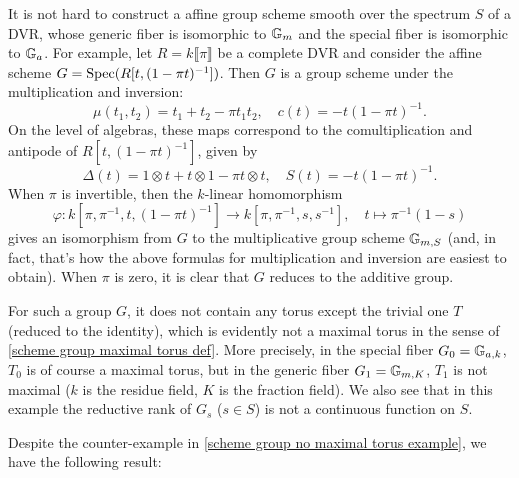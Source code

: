 \begin{remark}\label{scheme group no maximal torus example}
It is not hard to construct a affine group scheme smooth over the spectrum $S$ of a DVR, whose generic fiber is isomorphic to $\mathbb{G}_m$ and the special fiber is isomorphic to $\mathbb{G}_a$. For example, let $R=k\llbracket\pi\rrbracket$ be a complete DVR and consider the affine scheme $G=\mathrm{Spec}(R[t,(1-\pi t)^{-1}])$. Then $G$ is a group scheme under the multiplication and inversion:
\[\mu(t_1,t_2)=t_1+t_2-\pi t_1t_2,\quad c(t)=-t(1-\pi t)^{-1}.\]
On the level of algebras, these maps correspond to the comultiplication and antipode of $R[t,(1-\pi t)^{-1}]$, given by
\[\Delta(t)=1\otimes t+t\otimes 1-\pi t\otimes t,\quad S(t)=-t(1-\pi t)^{-1}.\]
When $\pi$ is invertible, then the $k$-linear homomorphism
\[\varphi:k[\pi,\pi^{-1},t,(1-\pi t)^{-1}]\to k[\pi,\pi^{-1},s,s^{-1}],\quad t\mapsto\pi^{-1}(1-s)\]
gives an isomorphism from $G$ to the multiplicative group scheme $\mathbb{G}_{m,S}$ (and, in fact, that's how the above formulas for multiplication and inversion are easiest to obtain). When $\pi$ is zero, it is clear that $G$ reduces to the additive group.\par
For such a group $G$, it does not contain any torus except the trivial one $T$ (reduced to the identity), which is evidently not a maximal torus in the sense of \cref{scheme group maximal torus def}. More precisely, in the special fiber $G_0=\mathbb{G}_{a,k}$, $T_0$ is of course a maximal torus, but in the generic fiber $G_1=\mathbb{G}_{m,K}$, $T_1$ is not maximal ($k$ is the residue field, $K$ is the fraction field). We also see that in this example the reductive rank of $G_s$ ($s\in S$) is not a continuous function on $S$.
\end{remark}

Despite the counter-example in \cref{scheme group no maximal torus example}, we have the following result:

